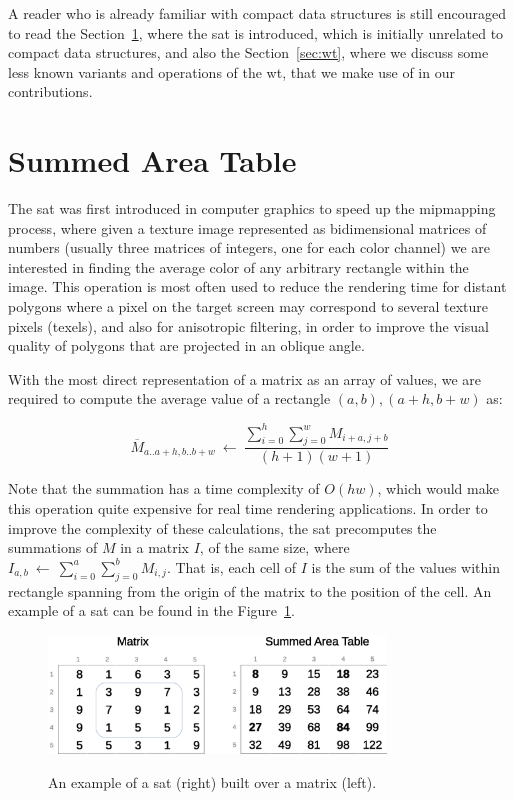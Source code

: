 \documentclass[a4paper,10pt,twoside]{book}
\begin{document}
	A reader who is already familiar with compact data structures is still encouraged to read the Section~\ref{sec:sat}, where the \gls{sat} is introduced, which is initially unrelated to compact data structures, and also the Section~\ref{sec:wt}, where we discuss some less known variants and operations of the \gls{wt}, that we make use of in our contributions.
	
	\section{Summed Area Table}
	\label{sec:sat}
	The \gls{sat} was first introduced in computer graphics \cite{crow1984summed} to speed up the mipmapping process, where given a texture image represented as bidimensional matrices of numbers (usually three matrices of integers, one for each color channel) we are interested in finding the average color of any arbitrary rectangle within the image. This operation is most often used to reduce the rendering time for distant polygons where a pixel on the target screen may correspond to several texture pixels (texels), and also for anisotropic filtering, in order to improve the visual quality of polygons that are projected in an oblique angle.

    With the most direct representation of a matrix as an array of values, we are required to compute the average value of a rectangle $(a,b),(a+h,b+w)$ as:
    
    \[
    \overline{M}_{a..a+h,b..b+w}~\leftarrow~
    \frac{\displaystyle\sum^h_{i=0}\displaystyle\sum^w_{j=0}M_{i+a,j+b}}
    {(h+1)(w+1)}
    \]
    
    Note that the summation has a time complexity of $O(hw)$, which would make this operation quite expensive for real time rendering applications. In order to improve the complexity of these calculations, the \gls{sat} precomputes the summations of $M$ in a matrix $I$, of the same size, where $I_{a,b}~\leftarrow~\displaystyle\sum^a_{i=0}\displaystyle\sum^b_{j=0}M_{i,j}$. That is, each cell of $I$ is the sum of the values within rectangle spanning from the origin of the matrix to the position of the cell. An example of a \gls{sat} can be found in the Figure~\ref{fig:sat}.
    
    \begin{figure}[ht]
		\begin{center}
			{\includegraphics[width=0.8\textwidth]{figures/example_sat.eps}}
		\end{center}
		\caption{An example of a \acrlong{sat} (right) built over a matrix (left).}
		\label{fig:sat}
	\end{figure}
    
\end{document}

